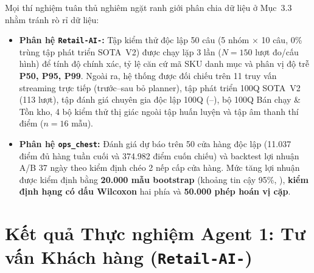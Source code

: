 Mọi thí nghiệm tuân thủ nghiêm ngặt ranh giới phân chia dữ liệu ở Mục~3.3 nhằm tránh rò rỉ dữ liệu:
\begin{itemize}
    \item \textbf{Phân hệ \texttt{Retail-AI-}:} Tập kiểm thử độc lập 50 câu (5 nhóm $\times$ 10 câu, 0\% trùng tập phát triển SOTA~V2) được chạy lặp 3 lần ($N=150$ lượt đo/cấu hình) để tính độ chính xác, tỷ lệ căn cứ mã SKU danh mục và phân vị độ trễ \textbf{P50, P95, P99}. Ngoài ra, hệ thống được đối chiếu trên 11 truy vấn streaming trực tiếp (trước--sau bỏ planner), tập phát triển 100Q SOTA~V2 (113 lượt), tập đánh giá chuyên gia độc lập 100Q (--), bộ 100Q Bán chạy \& Tồn kho, 4 bộ kiểm thử thị giác ngoài tập huấn luyện và tập âm thanh thí điểm ($n=16$ mẫu).
    \item \textbf{Phân hệ \texttt{ops\_chest}:} Đánh giá dự báo trên 50 cửa hàng độc lập (11.037 điểm đủ hàng tuần cuối và 374.982 điểm cuốn chiếu) và backtest lợi nhuận A/B 37 ngày theo kiểm định chéo 2 nếp cấp cửa hàng. Mức tăng lợi nhuận được kiểm định bằng \textbf{20.000 mẫu bootstrap} (khoảng tin cậy 95\%, ), \textbf{kiểm định hạng có dấu Wilcoxon} hai phía và \textbf{50.000 phép hoán vị cặp}.
\end{itemize}

\section{Kết quả Thực nghiệm Agent 1: Tư vấn Khách hàng (\texttt{Retail-AI-})}

